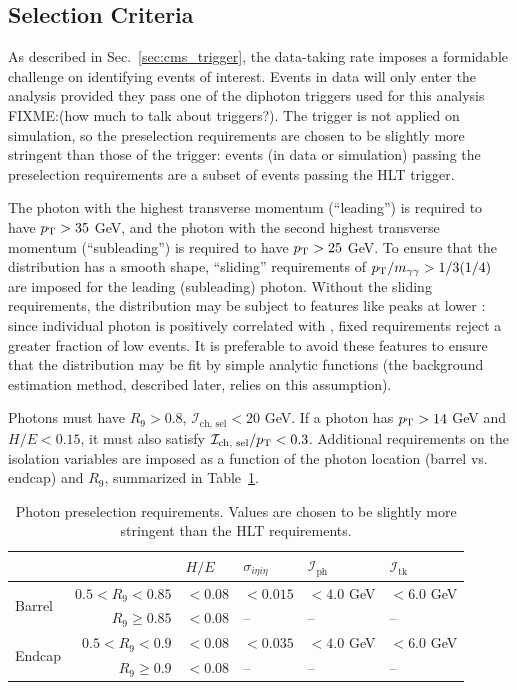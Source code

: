 \subsection{Selection Criteria} \label{sec:evt_photon_sel}
As described in Sec.~\ref{sec:cms_trigger}, the data-taking rate imposes a formidable challenge on identifying events of interest.
Events in data will only enter the analysis provided they pass one of the diphoton triggers used for this analysis FIXME:(how much to talk about triggers?).
The trigger is not applied on simulation, so the preselection requirements are chosen to be slightly more stringent than those of the trigger: events (in data or simulation) passing the preselection requirements are a subset of events passing the HLT trigger.

The photon with the highest transverse momentum (``leading'') is required to have $p_{\mathrm{T}} > 35$ GeV, and the photon with the second highest transverse momentum (``subleading'') is required to have $p_{\mathrm{T}} > 25$ GeV.
To ensure that the \mgg distribution has a smooth shape, ``sliding'' \pT requirements of $p_{\mathrm{T}}/m_{\gamma\gamma} > 1/3 (1/4)$ are imposed for the leading (subleading) photon.
Without the sliding \pT requirements, the \mgg distribution may be subject to features like peaks at lower \mgg: since individual photon \pT is positively correlated with \mgg, fixed \pT requirements reject a greater fraction of low \mgg events.
It is preferable to avoid these features to ensure that the \mgg distribution may be fit by simple analytic functions (the background estimation method, described later, relies on this assumption).

Photons must have $R_9 > 0.8$, $\mathcal I_{\text{ch, sel}} < 20$ GeV.
If a photon has $p_{\mathrm{T}} > 14$ GeV and $H/E < 0.15$, it must also satisfy $\mathcal I_{\text{ch, sel}}/p_{\mathrm{T}} < 0.3$.
Additional requirements on the isolation variables are imposed as a function of the photon location (barrel vs. endcap) and $R_9$, summarized in Table~\ref{tab:photon_presel}.
\begin{table} [h!]
    \centering
    \begin{tabular}{ l r | l | l | l | l } \hline \hline
        & & $H/E$ & $\sigma_{i\eta i\eta}$ & $\mathcal I_{\text{ph}}$ & $\mathcal I_{\text{tk}}$  \\ \hline
        \multirow{2}{*}{Barrel} & $0.5 < R_9 < 0.85$ & $<0.08$ & $<0.015$ & $<4.0$ GeV & $<6.0$ GeV \\
                                & $R_9 \geq 0.85$ & $<0.08$ & -- & -- & -- \\ \hline
        \multirow{2}{*}{Endcap} & $0.5 < R_9 < 0.9$ & $<0.08$ & $<0.035$ & $<4.0$ GeV & $<6.0$ GeV \\
                                & $R_9 \geq 0.9$ & $<0.08$ & -- & -- & -- \\ \hline \hline 
    \end{tabular}
    \caption{Photon preselection requirements. Values are chosen to be slightly more stringent than the HLT requirements.}
    \label{tab:photon_presel}
\end{table}
